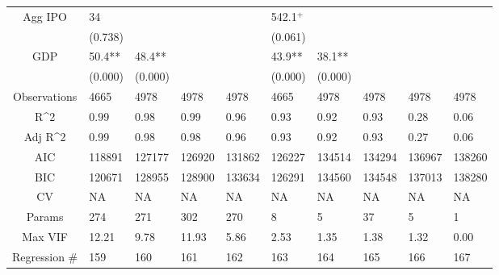 \documentclass{article}
\begin{document}
\begin{table}[H]
\begin{tabular}{|clllllllll|}
  Agg IPO & 34 &  &  &  & 542.1$^{+}$ &  &  &  &  \\ 
   & (0.738) &  &  &  & (0.061) &  &  &  &  \\ 
  GDP & 50.4** & 48.4** &  &  & 43.9** & 38.1** &  &  &  \\ 
   & (0.000) & (0.000) &  &  & (0.000) & (0.000) &  &  &  \\ 
  \hline 
 Observations & 4665 & 4978 & 4978 & 4978 & 4665 & 4978 & 4978 & 4978 & 4978 \\ 
  R^2 & 0.99 & 0.98 & 0.99 & 0.96 & 0.93 & 0.92 & 0.93 & 0.28 & 0.06 \\ 
  Adj R^2 & 0.99 & 0.98 & 0.98 & 0.96 & 0.93 & 0.92 & 0.93 & 0.27 & 0.06 \\ 
  AIC & 118891 & 127177 & 126920 & 131862 & 126227 & 134514 & 134294 & 136967 & 138260 \\ 
  BIC & 120671 & 128955 & 128900 & 133634 & 126291 & 134560 & 134548 & 137013 & 138280 \\ 
  CV & NA & NA & NA & NA & NA & NA & NA & NA & NA \\ 
  Params & 274 & 271 & 302 & 270 & 8 & 5 & 37 & 5 & 1 \\ 
  Max VIF & 12.21 & 9.78 & 11.93 & 5.86 & 2.53 & 1.35 & 1.38 & 1.32 & 0.00 \\ 
  Regression \# & 159 & 160 & 161 & 162 & 163 & 164 & 165 & 166 & 167 \\ 
   \hline
\end{tabular}
 
\end{table}
\end{document}
